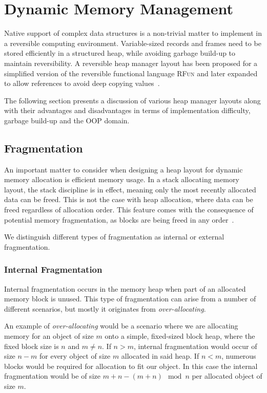 \chapter{Dynamic Memory Management}
\label{chp:dynamic-memory-management}
Native support of complex data structures is a non-trivial matter to implement in a reversible computing environment. Variable-sized records and frames need to be stored efficiently in a structured heap, while avoiding garbage build-up to maintain reversibility. A reversible heap manager layout has been proposed for a simplified version of the reversible functional language \textsc{RFun} and later expanded to allow references to avoid deep copying values~\cite{ha:heap, ty:rfun, tm:refcounting}.

The following section presents a discussion of various heap manager layouts along with their advantages and disadvantages in terms of implementation difficulty, garbage build-up and the OOP domain. 

\section{Fragmentation}
\label{sec:fragmentation}
An important matter to consider when designing a heap layout for dynamic memory allocation is efficient memory usage. In a stack allocating memory layout, the stack discipline is in effect, meaning only the most recently allocated data can be freed. This is not the case with heap allocation, where data can be freed regardless of allocation order. This feature comes with the consequence of potential memory fragmentation, as blocks are being freed in any order~\cite{tm:languages}.

We distinguish different types of fragmentation as internal or external fragmentation.

\subsection{Internal Fragmentation}
Internal fragmentation occurs in the memory heap when part of an allocated memory block is unused. This type of fragmentation can arise from a number of different scenarios, but mostly it originates from \textit{over-allocating}. 

An example of \textit{over-allocating} would be a scenario where we are allocating memory for an object of size $m$ onto a simple, fixed-sized block heap, where the fixed block size is $n$ and $m \neq n$. If $n > m$, internal fragmentation would occur of size $n-m$ for every object of size $m$ allocated in said heap. If $n < m$, numerous blocks would be required for allocation to fit our object. In this case the internal fragmentation would be of size $m + n - (m + n) \mod n$ per allocated object of size $m$. 

